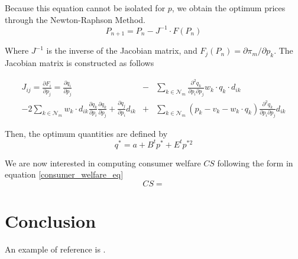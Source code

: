 \documentclass[12pt]{article}
\begin{document}
Because this equation cannot be isolated for $p$, we obtain the optimum prices through the Newton-Raphson Method.
\begin{equation*}
P_{n+1} = P_n - J^{-1} \cdot F(P_n)
\end{equation*}

Where $J^{-1}$ is the inverse of the Jacobian matrix, and $F_j(P_n) = \partial \pi_m / \partial p_k$. The Jacobian matrix is constructed as follows

\begin{eqnarray*}
J_{ij} = \frac{\partial F_i}{\partial p_j} = \frac{\partial q_i}{\partial p_j} &-& \sum_{k \in \mathcal{N}_m} \frac{\partial^2 q_k}{\partial p_i \partial p_j} w_k \cdot q_k \cdot d_{ik}\\
 - 2\sum_{k \in \mathcal{N}_m} w_k \cdot d_{ik} \frac{\partial q_k}{\partial p_i} \frac{\partial q_k}{\partial p_j} + \frac{\partial q_j}{\partial p_i} d_{ik} &+& \sum_{k \in \mathcal{N}_m} (p_k - v_k - w_k \cdot q_k) \frac{\partial^2 q_k}{\partial p_i \partial p_j}d_{ik}
\end{eqnarray*}

Then, the optimum quantities are defined by 
\begin{equation*}
q^* = a + B^t p^* + E^t p^{*2}
\end{equation*}

We are now interested in computing consumer welfare $CS$ following the form in equation \ref{consumer_welfare_eq}
\begin{equation*}
CS = 
\end{equation*}

\section{Conclusion}

An example of reference is \cite{abc}.
\end{document}
